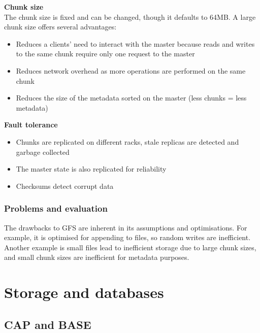 \documentclass{sty/SizheArticle}
\begin{document}
\textbf{Chunk size} \\
The chunk size is fixed and can be changed, though it defaults to 64MB. A
large chunk size offers several advantages:
\begin{itemize}
\item Reduces a clients' need to interact with the master because reads and
writes to the same chunk require only one request to the master
\item Reduces network overhead as more operations are performed on the
same chunk
\item Reduces the size of the metadata sorted on the master (less chunks = less
metadata)
\end{itemize}

\textbf{Fault tolerance} \\
\begin{itemize}
\item Chunks are replicated on different racks, stale replicas are detected and
garbage collected
\item The master state is also replicated for reliability
\item Checksums detect corrupt data
\end{itemize}

\subsubsection{Problems and evaluation}
The drawbacks to GFS are inherent in its assumptions and optimisations.
For example, it is optimised for appending to files, so random writes are
inefficient. Another example is small files lead to inefficient storage
due to large chunk sizes, and small chunk sizes are inefficient for
metadata purposes.



\section{Storage and databases}
\subsection{CAP and BASE}
\end{document}
